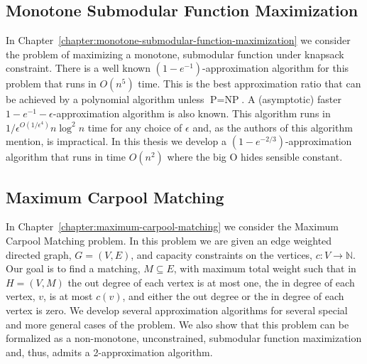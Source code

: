 \subsection*{Monotone Submodular Function Maximization} 
In Chapter~\ref{chapter:monotone-submodular-function-maximization} we consider the problem of maximizing a monotone, submodular function under knapsack constraint.
There is a well known $(1-e^{-1})$-approximation algorithm for this problem that runs in $O(n^5)$ time.
This is the best approximation ratio that can be achieved by a polynomial algorithm unless $\text{P} = \text{NP}$.
A (asymptotic) faster $1 - e^{-1} - \epsilon$-approximation algorithm is also known.
This algorithm runs in $1/\epsilon^{O(1/\epsilon^4)}n\log^2n$ time for any choice of $\epsilon$ and, as the authors of this algorithm mention, is impractical.
In this thesis we develop a $(1-e^{-2/3})$-approximation algorithm that runs in time $O(n^2)$ where the big O hides sensible constant.

\subsection*{Maximum Carpool Matching}
In Chapter~\ref{chapter:maximum-carpool-matching} we consider the Maximum Carpool Matching problem.
In this problem we are given an edge weighted directed graph, $G=(V, E)$, and capacity constraints on the vertices, $c:V \to \mathbb{N}$.
Our goal is to find a matching, $M \subseteq E$, with maximum total weight such that in $H = (V, M)$ the out degree of each vertex is at most one, the in degree of each vertex, $v$, is at most $c(v)$, and either the out degree or the in degree of each vertex is zero.
We develop several approximation algorithms for several special and more general cases of the problem.
We also show that this problem can be formalized as a non-monotone, unconstrained, submodular function maximization and, thus, admits a 2-approximation algorithm.